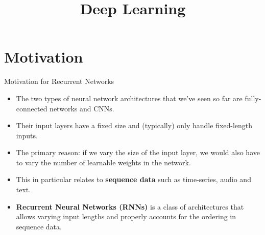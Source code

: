 






\newcommand{\titlefigure}{figure/rnn_sample_z5.png}
\newcommand{\learninggoals}{
  \item Why do we need them?
  \item How do they work?
  \item Computational Graph o Recurrent Networks
}

\title{Deep Learning}
\date{}







\section{Motivation}

\begin{frame} {Motivation for Recurrent Networks}
  \begin{itemize}
    \item The two types of neural network architectures that we've seen so far are fully-connected networks and CNNs.
    \item Their input layers have a fixed size and (typically) only handle fixed-length inputs.
    \item The primary reason: if we vary the size of the input layer, we would also have to vary the number of learnable weights in the network.
    \item This in particular relates to \textbf{sequence data} such as time-series, audio and text.
    \item \textbf{Recurrent Neural Networks (RNNs)} is a class of architectures that allows varying input lengths and properly accounts for the ordering in sequence data.
  \end{itemize}
\end{frame}



 
